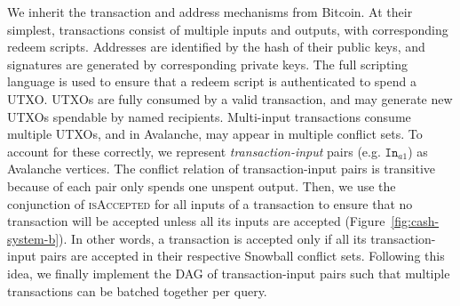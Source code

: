 \documentclass[letterpaper,twocolumn,10pt]{article}
\theoremstyle{definition}
\begin{document}
%
%
%    
%
We inherit the transaction and address mechanisms from Bitcoin. At their simplest, transactions consist of multiple inputs and outputs, with corresponding redeem scripts.
Addresses are identified by the hash of their public keys, and signatures are generated by corresponding private keys.
The full scripting language is used to ensure that a redeem script is authenticated to spend a UTXO\@.
UTXOs are fully consumed by a valid transaction, and may generate new UTXOs spendable by named recipients.
Multi-input transactions consume multiple UTXOs, and in Avalanche, may appear in multiple conflict sets.
To account for these correctly, we represent \emph{transaction-input} pairs (e.g. $\texttt{In}_{a1}$) as Avalanche vertices.
The conflict relation of transaction-input pairs is transitive because of each pair only spends one unspent output.
Then, we use the conjunction of \textsc{isAccepted} for all inputs of a transaction to ensure that no transaction will be accepted unless all its inputs are accepted (Figure~\ref{fig:cash-system-b}). In other words, a transaction is accepted only if all its transaction-input pairs are accepted in their respective Snowball conflict sets.
Following this idea, we finally implement the DAG of transaction-input pairs such that multiple
transactions can be batched together per query.
\end{document}
